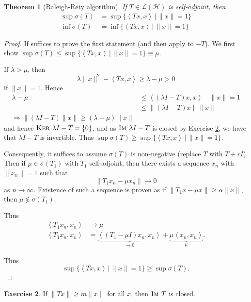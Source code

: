 \documentclass[10pt, oneside, reqno]{amsart}
\theoremstyle{plain}%
\newtheorem{thm}{Theorem}[section]
\numberwithin{equation}{section}
\theoremstyle{definition}
\newtheorem{exer}[thm]{Exercise}
\theoremstyle{remark}
\newcommand{\given}{ \, | \,}
\newcommand{\im}{\textsc{Im\ }}
\renewcommand{\ker}{\textsc{Ker\ }}
\newcommand{\iprod}[1]{\left\langle #1 \right\rangle}
\begin{document}
\begin{thm}[Raleigh-Rety algorithm]
	\label{thm:raleigh_rety}
	If $T \in \mathcal L(\mathcal H)$ is self-adjoint, then \begin{align*}
		\sup \sigma(T) &= \sup \{ \iprod{Tx, x} \given \| x \| = 1 \} \\
		\inf \sigma(T) &= \inf \{ \iprod{Tx, x} \given \| x \| = 1 \}
	\end{align*}
\end{thm}

\begin{proof}
	If suffices to prove the first statement (and then apply to $-T$).  We first show $\sup \sigma(T) \leq \sup \{ \iprod{Tx, x} \given \| x \| = 1 \} \equiv \mu$.    
	
	If $\lambda > \mu$, then \[
		\lambda \| x \|^2 - \iprod{Tx, x} \geq \lambda - \mu > 0
	\] if $\| x \| = 1$.  Hence \begin{align*}
		\lambda - \mu 	&\leq \iprod{(\lambda I - T)x, x} \quad \| x \| = 1 \\
						&\leq \| (\lambda I - T)x \| \| x \| \\
					\Rightarrow \| (\lambda I - T)\| x \| \geq (\lambda - \mu) \| x \|
	\end{align*} and hence $\ker \lambda I - T = \{ 0 \}$, and as $\im \lambda I - T$ is closed by Exercise \ref{exer:closed_range_condition}, we have that $\lambda I - T$ is invertible.  Thus $\sup \sigma(T) \geq \sup \{ \iprod{Tx, x} \given \| x \| = 1 \}$. 
	
	Consequently, it suffices to assume $\sigma(T)$ is non-negative (replace $T$ with $T + rI$).  Then if $\mu \in \sigma(T_1)$ with $T_1$ self-adjoint, then there exists a sequence $x_n$ with $\| x_n \| = 1$ such that \[
		\| T_1 x_n - \mu x_n \| \rightarrow 0 
	\] as $n \rightarrow \infty$.  Existence of such a sequence is proven as if $\| T_1 x - \mu x \| \geq \alpha \| x \|$, then $\mu \notin \sigma(T_1)$.  
	
	Thus \begin{align*}
		\iprod{T_1 x_n, x_n} &\rightarrow \mu \\
		\iprod{T_1 x_n, x_n} &= \underbrace{\iprod{ (T_1 - \mu I) x_n, x_n}}_{\rightarrow 0} + \underbrace{\mu \iprod{x_n, x_n}}_{\mu}.
	\end{align*}
	
	Thus \[
		\sup \{ \iprod{Tx, x} \given \| x \| = 1\} \geq \sup \sigma(T).
	\]
\end{proof}

\begin{exer}
	\label{exer:closed_range_condition}
	If $\| Tx \| \geq m \| x \|$ for all $x$, then $\im T$ is closed.
\end{exer}
\end{document}
